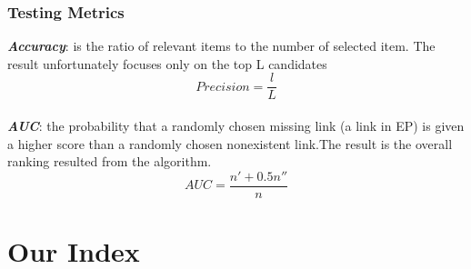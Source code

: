 \documentclass{beamer}
\begin{document}
\begin{frame}
  \frametitle{Testing Metrics}
  \emph{\textbf{Accuracy}}: is the ratio of relevant items
to the number of selected item. The result unfortunately focuses only on the top L candidates\\
    \[Precision = \dfrac{l}{L}\] \\
  \bigskip 
  \emph{\textbf{AUC}}: the probability that a randomly chosen missing link (a link in EP) is given a higher score than a randomly chosen nonexistent link.The result is the overall ranking resulted from the algorithm. \\
   \[AUC = \dfrac{n' + 0.5n''}{n}\]
\end{frame}

\section{Our Index}
\end{document}
